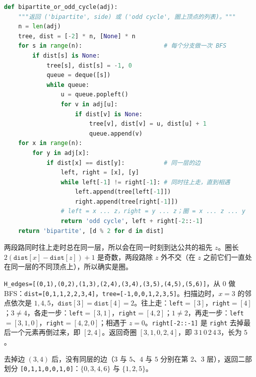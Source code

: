 \begin{lstlisting}[language=Python]
def bipartite_or_odd_cycle(adj):
    """返回 ('bipartite', side) 或 ('odd cycle', 圈上顶点的列表)。"""
    n = len(adj)
    tree, dist = [-2] * n, [None] * n
    for s in range(n):                       # 每个分支做一次 BFS
        if dist[s] is None:
            tree[s], dist[s] = -1, 0
            queue = deque([s])
            while queue:
                u = queue.popleft()
                for v in adj[u]:
                    if dist[v] is None:
                        tree[v], dist[v] = u, dist[u] + 1
                        queue.append(v)
    for x in range(n):
        for y in adj[x]:
            if dist[x] == dist[y]:           # 同一层的边
                left, right = [x], [y]
                while left[-1] != right[-1]: # 同时往上走，直到相遇
                    left.append(tree[left[-1]])
                    right.append(tree[right[-1]])
                # left = x ... z，right = y ... z；圈 = x ... z ... y
                return 'odd cycle', left + right[-2::-1]
    return 'bipartite', [d % 2 for d in dist]
\end{lstlisting}

两段路同时往上走时总在同一层，所以会在同一时刻到达公共的祖先 $z$。圈长 $2(\texttt{dist}[x]-\texttt{dist}[z])+1$ 是奇数，两段路除 $z$ 外不交（在 $z$ 之前它们一直处在同一层的不同顶点上），所以确实是圈。

\begin{example}
\texttt{H\_edges=[(0,1),(0,2),(1,3),(2,4),(3,4),(3,5),(4,5),(5,6)]}，从 $0$ 做 BFS：\texttt{dist=[0,1,1,2,2,3,4]}，\texttt{tree=[-1,0,0,1,2,3,5]}。扫描边时，$x=3$ 的邻点依次是 $1,4,5$，$\texttt{dist}[3]=\texttt{dist}[4]=2$。往上走：\texttt{left}$=[3]$，\texttt{right}$=[4]$；$3\neq4$，各走一步：\texttt{left}$=[3,1]$，\texttt{right}$=[4,2]$；$1\neq2$，再走一步：\texttt{left}$=[3,1,0]$，\texttt{right}$=[4,2,0]$；相遇于 $z=0$。\texttt{right[-2::-1]} 是 \texttt{right} 去掉最后一个元素再倒过来，即 $[2,4]$。返回奇圈 $[3,1,0,2,4]$，即 $3\,1\,0\,2\,4\,3$，长为 $5$。

去掉边 $(3,4)$ 后，没有同层的边（$3$ 与 $5$、$4$ 与 $5$ 分别在第 $2$、$3$ 层），返回二部划分 \texttt{[0,1,1,0,0,1,0]}：$\{0,3,4,6\}$ 与 $\{1,2,5\}$。
\end{example}

\begin{center}
\end{center}

